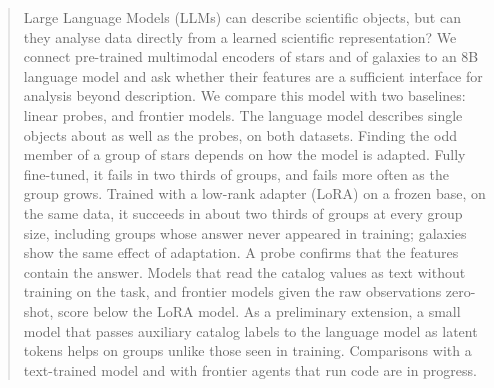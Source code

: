 \begin{abstract}
Large Language Models (LLMs) can describe scientific objects, but can they analyse data
directly from a learned scientific representation? We connect pre-trained multimodal encoders
of stars and of galaxies to an 8B language model and ask whether their features are a
sufficient interface for analysis beyond description. We compare this model with two baselines:
linear probes, and frontier models. The language
model describes single objects about as well as the probes, on both datasets. Finding the odd
member of a group of stars depends on how the model is adapted. Fully fine-tuned, it fails in
two thirds of groups, and fails more often as the group grows. Trained with a low-rank adapter
(LoRA) on a frozen base, on the same data, it succeeds in about two thirds of groups at every
group size, including groups whose answer never appeared in training; galaxies show the same
effect of adaptation. A probe confirms that the features contain the answer. Models that read
the catalog values as text without training on the task, and frontier models given the raw
observations zero-shot, score below the LoRA model. As a preliminary extension, a small model
that passes auxiliary catalog labels to the language model as latent tokens helps on groups
unlike those seen in training. Comparisons with a text-trained model and with frontier agents
that run code are in progress.
\end{abstract}

